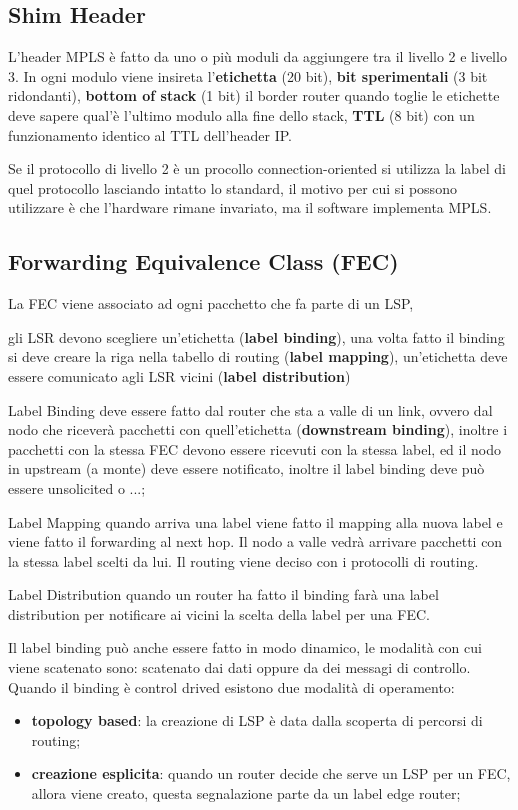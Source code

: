 \documentclass[12pt]{article}
\begin{document}
\subsection{Shim Header}
L'header MPLS \`e fatto da uno o pi\`u moduli da aggiungere tra il livello 2 e livello 3. In ogni modulo viene insireta l'\textbf{etichetta} (20 bit), \textbf{bit sperimentali} (3 bit ridondanti), \textbf{bottom of stack} (1 bit) il border router quando toglie le etichette deve sapere qual'\`e l'ultimo modulo alla fine dello stack, \textbf{TTL} (8 bit) con un funzionamento identico al TTL dell'header IP.

Se il protocollo di livello 2 \`e un procollo connection-oriented si utilizza la label di quel protocollo lasciando intatto lo standard, il motivo per cui si possono utilizzare \`e che l'hardware rimane invariato, ma il software implementa MPLS.

\subsection{Forwarding Equivalence Class (FEC)}
La FEC viene associato ad ogni pacchetto che fa parte di un LSP, 

gli LSR devono scegliere un'etichetta (\textbf{label binding}), una volta fatto il binding si deve creare la riga nella tabello di routing (\textbf{label mapping}), un'etichetta deve essere comunicato agli LSR vicini (\textbf{label distribution})

Label Binding deve essere fatto dal router che sta a valle di un link, ovvero dal nodo che ricever\`a pacchetti con quell'etichetta (\textbf{downstream binding}), inoltre i pacchetti con la stessa FEC devono essere ricevuti con la stessa label, ed il nodo in upstream (a monte) deve essere notificato, inoltre il label binding deve pu\`o essere unsolicited o ...;

Label Mapping quando arriva una label viene fatto il mapping alla nuova label e viene fatto il forwarding al next hop. Il nodo a valle vedr\`a arrivare pacchetti con la stessa label scelti da lui. Il routing viene deciso con i protocolli di routing.

Label Distribution quando un router ha fatto il binding far\`a una label distribution per notificare ai vicini la scelta della label per una FEC.

Il label binding pu\`o anche essere fatto in modo dinamico, le modalit\`a con cui viene scatenato sono: scatenato dai dati oppure da dei messagi di controllo. Quando il binding \`e control drived esistono due modalit\`a di operamento:
\begin{itemize}
    \item \textbf{topology based}: la creazione di LSP \`e data dalla scoperta di percorsi di routing;
    \item \textbf{creazione esplicita}: quando un router decide che serve un LSP per un FEC, allora viene creato, questa segnalazione parte da un label edge router;
\end{itemize}
\end{document}
